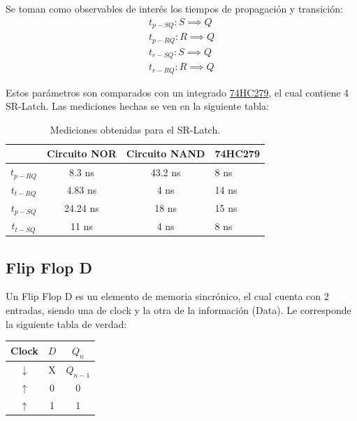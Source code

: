 Se toman como observables de interés los tiempos de propagación y transición:
\begin{equation*}
\begin{split}
	t_{p-SQ}: S \implies Q \\
	t_{p-RQ}: R \implies Q \\
	t_{r-SQ}: S \implies Q \\
	t_{r-RQ}: R \implies Q
\end{split}
\end{equation*}

Estos parámetros son comparados con un integrado \href{http://noel.feld.cvut.cz/hw/st/1937.pdf}{74HC279}, el cual contiene 4 SR-Latch. Las mediciones hechas se ven en la siguiente tabla:
\begin{table}[H]
\centering
\begin{tabular}{cccl}
\hline
\textit{}           & \textbf{Circuito NOR} & \textbf{Circuito NAND} & \textbf{74HC279} \\ \hline
\textbf{$t_{p-RQ}$} & 8.3 ns                 & 43.2 ns                 & 8 ns              \\
\textbf{$t_{t-RQ}$} & 4.83 ns                & 4 ns                    & 14 ns             \\
\textbf{$t_{p-SQ}$} & 24.24 ns               & 18 ns                   & 15 ns             \\
\textbf{$t_{t-SQ}$} & 11 ns                  & 4 ns                    & 8 ns             \\
\hline
\end{tabular}
\caption{Mediciones obtenidas para el SR-Latch.}
\label{tab:srl}
\end{table}

\subsection{Flip Flop D}

Un Flip Flop D es un elemento de memoria sincrónico, el cual cuenta con 2 entradas, siendo una de clock y la otra de la información (Data). Le corresponde la siguiente tabla de verdad:
\begin{table}[H]
\centering
\begin{tabular}{cc|c}
\hline
\textbf{Clock} & \textbf{$D$} & \textbf{$Q_n$} \\ \hline
$\downarrow$   & X            & $Q_{n-1}$      \\
$\uparrow$     & 0            & 0              \\
$\uparrow$     & 1            & 1             \\
\hline
\end{tabular}
\end{table}

